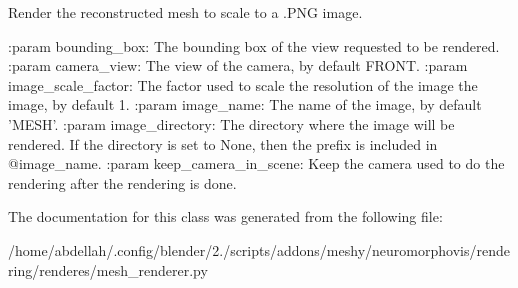 \begin{DoxyVerb}Render the reconstructed mesh to scale to a .PNG image.

:param bounding_box:
    The bounding box of the view requested to be rendered.
:param camera_view:
    The view of the camera, by default FRONT.
:param image_scale_factor:
    The factor used to scale the resolution of the image the image, by default 1.
:param image_name:
    The name of the image, by default 'MESH'.
:param image_directory:
    The directory where the image will be rendered. If the directory is set to None,
    then the prefix is included in @image_name.
:param keep_camera_in_scene:
    Keep the camera used to do the rendering after the rendering is done.
\end{DoxyVerb}
 

The documentation for this class was generated from the following file\+:\begin{DoxyCompactItemize}
\item 
/home/abdellah/.\+config/blender/2./scripts/addons/meshy/neuromorphovis/rendering/renderes/mesh\+\_\+renderer.\+py\end{DoxyCompactItemize}
